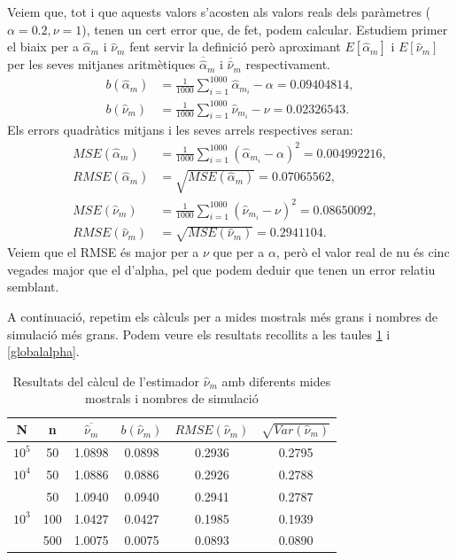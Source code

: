 \documentclass[12pt, catalan]{article}
\numberwithin{table}{section}
\numberwithin{figure}{section}
\numberwithin{equation}{section}
\begin{document}
Veiem que, tot i que aquests valors s'acosten als valors reals dels paràmetres ($\alpha=0.2,\nu=1$), tenen un cert error que, de fet, podem calcular. Estudiem primer el biaix per a $\hat{\alpha}_m$ i $\hat{\nu}_m$ fent servir la definició però aproximant $E[\hat{\alpha}_m]$ i $E[\hat{\nu}_m]$ per les seves mitjanes aritmètiques $\overline{\hat{\alpha}}_m$ i $\overline{\hat{\nu}}_m$ respectivament.
\begin{align*}
    b(\hat{\alpha}_m)&=\frac{1}{1000}\sum_{i=1}^{1000}\hat{\alpha}_{m_i}-\alpha=0.09404814,\\
    b(\hat{\nu}_m)&=\frac{1}{1000}\sum_{i=1}^{1000}\hat{\nu}_{m_i}-\nu=0.02326543.
\end{align*}
Els errors quadràtics mitjans i les seves arrels respectives seran:
\begin{align*}
    MSE(\hat{\alpha}_m)&=\frac{1}{1000}\sum_{i=1}^{1000}(\hat{\alpha}_{m_i}-\alpha)^2=0.004992216,\\
    RMSE(\hat{\alpha}_m)&=\sqrt{MSE(\hat{\alpha}_m)}=0.07065562,\\
    MSE(\hat{\nu}_m)&=\frac{1}{1000}\sum_{i=1}^{1000}(\hat{\nu}_{m_i}-\nu)^2=0.08650092,\\
    RMSE(\hat{\nu}_m)&=\sqrt{MSE(\hat{\nu}_m)}=0.2941104.
\end{align*}
Veiem que el RMSE és major per a $\nu$ que per a $\alpha$, però el valor real de nu és cinc vegades major que el d'alpha, pel que podem deduir que tenen un error relatiu semblant. %

A continuació, repetim els càlculs per a mides mostrals més grans i nombres de simulació més grans. Podem veure els resultats recollits a les taules \ref{globalnu} i \ref{globalalpha}.

\begin{table}[h]
\centering
\caption{Resultats del càlcul de l'estimador $\hat{\nu}_m$ amb diferents mides mostrals i nombres de simulació}\vspace{0.3cm}
\begin{tabular}{|c|c|c|c|c|c|}
\hline
N                    & n   & $\overline{\hat{\nu}_m}$& $b(\hat{\nu}_m)$ & $RMSE(\hat{\nu}_m)$  & $\sqrt{Var(\hat{\nu}_m)}$ \\ \hline
$10^5$                  & 50  & 1.0898 &0.0898& 0.2936  & 0.2795   \\ \hline
$10^4$                   & 50  & 1.0886 &0.0886& 0.2926  & 0.2788   \\ \hline
\multirow{3}{*}{$10^3$ } & 50  & 1.0940 &0.0940& 0.2941  & 0.2787   \\ \cline{2-6} 
                     & 100 & 1.0427 &0.0427& 0.1985  & 0.1939   \\ \cline{2-6} 
                     & 500 & 1.0075 &0.0075& 0.0893 & 0.0890   \\ \hline
\end{tabular}
\label{globalnu}
\end{table}
\end{document}
